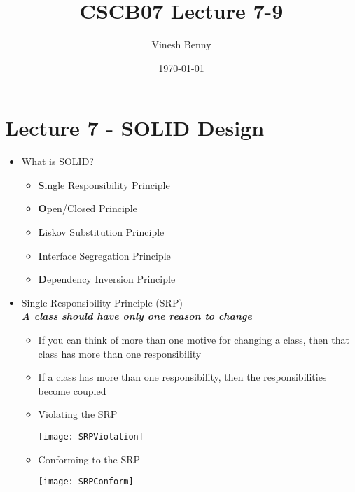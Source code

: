 \documentclass[11pt]{article}
\title{CSCB07 Lecture 7-9}
\author{Vinesh Benny}
\date{\today}
\begin{document}
\section*{Lecture 7 - SOLID Design}

\begin{itemize}
	\item What is SOLID?
		\begin{itemize}
			\item \textbf{S}ingle Responsibility Principle
			\item \textbf{O}pen/Closed Principle
			\item \textbf{L}iskov Substitution Principle
			\item \textbf{I}nterface Segregation Principle
			\item \textbf{D}ependency Inversion Principle
		\end{itemize}

	\item Single Responsibility Principle (SRP)\\
		\textbf{\emph{A class should have only one reason to change}}
		\begin{itemize}
			\item If you can think of more than one motive for changing a class, then that class has more than one responsibility
			\item If a class has more than one responsibility, then the responsibilities become coupled
			\item Violating the SRP\\
				\begin{center}
					\texttt{[image: SRPViolation]}
				\end{center}
			\item Conforming to the SRP
				\begin{center}
					\texttt{[image: SRPConform]}
				\end{center}
		\end{itemize}


\end{itemize}
\end{document}
